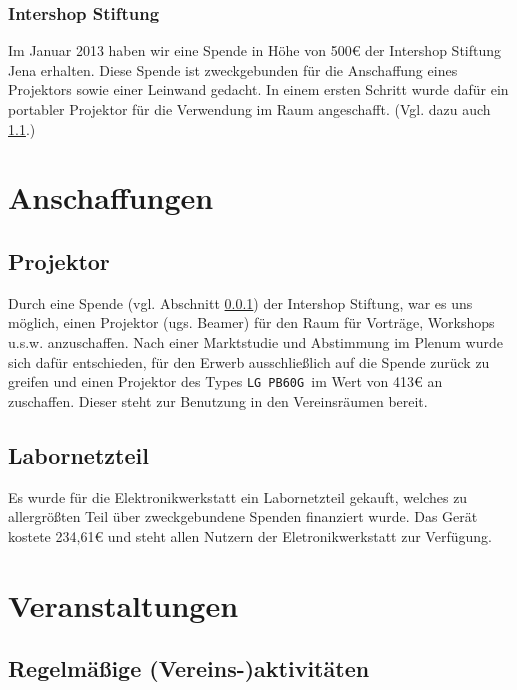 \documentclass[10pt,DIV16]{scrartcl}
\begin{document}
\subsubsection{Intershop Stiftung}
\label{sec:iss-spende}
Im Januar 2013 haben wir eine Spende in Höhe von 500\euro{} der Intershop
Stiftung Jena erhalten. Diese Spende ist zweckgebunden für die
Anschaffung eines Projektors sowie einer Leinwand gedacht. In einem
ersten Schritt wurde dafür ein portabler Projektor für die Verwendung
im Raum angeschafft. (Vgl. dazu auch \ref{sec:beamerkauf}.)


\section{Anschaffungen}
\label{sec:anschaffungen}

\subsection{Projektor}
\label{sec:beamerkauf}

Durch eine Spende (vgl. Abschnitt \ref{sec:iss-spende}) der
Intershop Stiftung, war es uns möglich, einen Projektor (ugs. Beamer) für den Raum
für Vorträge, Workshops u.s.w. anzuschaffen. Nach einer Marktstudie
und Abstimmung im Plenum wurde sich dafür entschieden, für den
Erwerb ausschließlich auf die Spende zurück zu greifen und einen
Projektor des Types \texttt{LG PB60G }im Wert von 413\euro{} an
zuschaffen. Dieser steht zur Benutzung in den Vereinsräumen bereit.

\subsection{Labornetzteil}
\label{sec:labornetzteil}

Es wurde für die Elektronikwerkstatt ein Labornetzteil gekauft, welches 
zu allergrößten Teil über zweckgebundene Spenden finanziert wurde. Das 
Gerät kostete 234,61\euro{} und steht allen Nutzern der 
Eletronikwerkstatt zur Verfügung.

\section{Veranstaltungen}

\subsection{Regelmäßige (Vereins-)aktivitäten}
\end{document}
